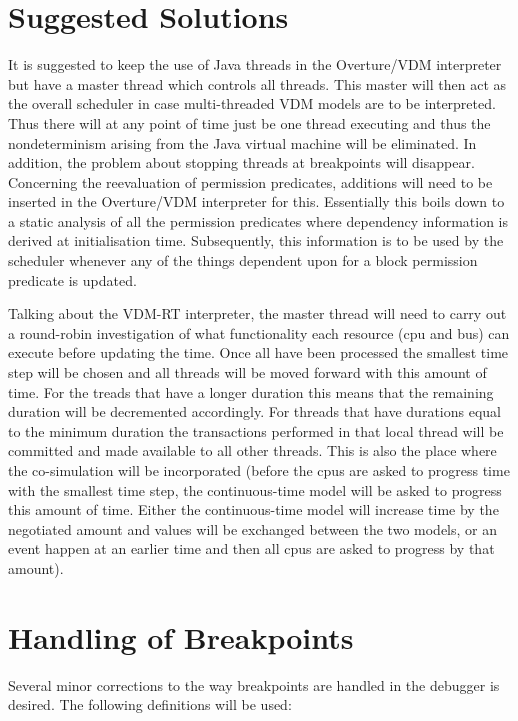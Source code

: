 \documentclass{overturerep}
\begin{document}
\section{Suggested Solutions}

It is suggested to keep the use of Java threads in the Overture/VDM
interpreter but have a master thread which controls all threads. This
master will then act as the overall scheduler in case multi-threaded
VDM models are to be interpreted. Thus there will at any point of time
just be one thread executing and thus the nondeterminism arising from
the Java virtual machine will be eliminated. In addition, the problem
about stopping threads at breakpoints will disappear. Concerning the
reevaluation of permission predicates, additions will need to be
inserted in the Overture/VDM interpreter for this. Essentially this
boils down to a static analysis of all the permission predicates where
dependency information is derived at initialisation time. Subsequently,
this information is to be used by the scheduler whenever any of the
things dependent upon for a block permission predicate is updated.

Talking about the VDM-RT interpreter, the master thread will need
to carry out a round-robin investigation of what functionality each
resource (cpu and bus) can execute before updating the time. Once
all have been processed the smallest time step will be
chosen and all threads will be moved forward with this amount of
time. For the treads that have a longer duration this means that the
remaining duration will be decremented accordingly. For threads that
have durations equal to the minimum duration the transactions
performed in that local thread will be committed and made available to
all other threads. This is also the place where the co-simulation
will be incorporated (before the cpus are asked to progress time with
the smallest time step, the continuous-time model will be asked to progress
this amount of time. Either the continuous-time model will increase time 
by the negotiated amount and values will be exchanged between the two
models, or an event happen at an earlier time and then all
cpus are asked to progress by that amount). 

\section{Handling of Breakpoints}

Several minor corrections to the way breakpoints are handled in the debugger is desired. The following definitions will be used:
\end{document}
